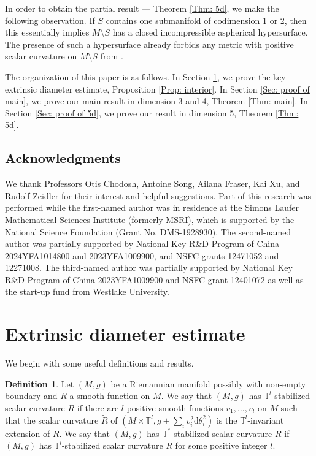 \documentclass[11pt, reqno]{amsart}
\numberwithin{equation}{section}
\theoremstyle{definition}
\newtheorem{definition}[theorem]{Definition}
\begin{document}
In order to obtain the partial result --- Theorem \ref{Thm: 5d}, we make the following observation. If $S$ contains one submanifold of codimension 1 or 2, then this essentially implies $M\setminus S$ has a closed incompressible aspherical hypersurface. The presence of such a hypersurface already forbids any metric with positive scalar curvature on $M\setminus S$ from \cite[Theorem 1.1]{CLSZ21}.

\bigskip

The organization of this paper is as follows. In Section \ref{Sec: extrinsic}, we prove the key extrinsic diameter estimate, Proposition \ref{Prop: interior}.
In Section \ref{Sec: proof of main}, we prove our main result in dimension 3 and 4, Theorem \ref{Thm: main}. In Section \ref{Sec: proof of 5d}, we prove
our result in dimension 5, Theorem \ref{Thm: 5d}.


\subsection*{Acknowledgments}
We thank Professors Otis Chodosh, Antoine Song, Ailana Fraser, Kai Xu, and Rudolf Zeidler for their interest and helpful suggestions. Part of this research was performed while the first-named author was in residence at the Simons Laufer Mathematical Sciences Institute (formerly MSRI), which is supported by the National Science Foundation (Grant No. DMS-1928930). The second-named author was partially supported by National Key R\&D Program of China 2024YFA1014800 and 2023YFA1009900, and NSFC grants 12471052 and 12271008. The third-named author was partially supported by National Key R\&D Program of China 2023YFA1009900 and NSFC grant 12401072 as well as the start-up fund from Westlake University.



\section{Extrinsic diameter estimate}
\label{Sec: extrinsic}
We begin with some useful definitions and results.
\begin{definition}\label{Defn: stabilized scalar curvature}
Let $(M,g)$ be a Riemannian manifold possibly with non-empty boundary and $R$ a smooth function on $M$. We say that $(M,g)$ has $\mathbb T^l$-stabilized scalar curvature $R$ if there are $l$ positive smooth functions $v_1,\ldots,v_l$ on $M$ such that the scalar curvature $\tilde R$ of $(M\times \mathbb T^l,g+\sum_i v_i^2\mathrm d\theta_i^2)$ is the $\mathbb T^l$-invariant extension of $R$.
We say that $(M,g)$ has $\mathbb T^*$-stabilized scalar curvature $R$ if $(M,g)$ has $\mathbb T^l$-stabilized scalar curvature $R$ for some positive integer $l$.
\end{definition}
\end{document}
